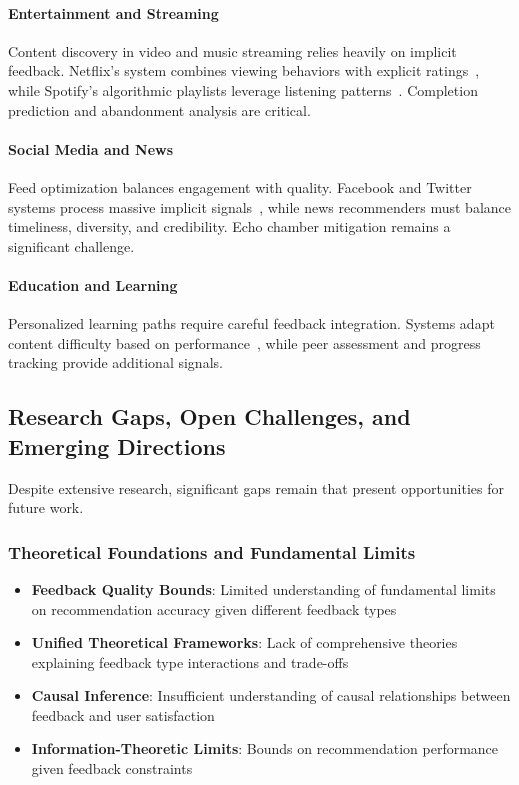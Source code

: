 \paragraph{Entertainment and Streaming}
Content discovery in video and music streaming relies heavily on implicit feedback. Netflix's system combines viewing behaviors with explicit ratings~\cite{gomez2015netflix}, while Spotify's algorithmic playlists leverage listening patterns~\cite{van2013deep}. Completion prediction and abandonment analysis are critical.

\paragraph{Social Media and News}
Feed optimization balances engagement with quality. Facebook and Twitter systems process massive implicit signals~\cite{wu2020mind}, while news recommenders must balance timeliness, diversity, and credibility. Echo chamber mitigation remains a significant challenge.

\paragraph{Education and Learning}
Personalized learning paths require careful feedback integration. Systems adapt content difficulty based on performance~\cite{tang2019towards}, while peer assessment and progress tracking provide additional signals.

\subsection{Research Gaps, Open Challenges, and Emerging Directions}

Despite extensive research, significant gaps remain that present opportunities for future work.

\subsubsection{Theoretical Foundations and Fundamental Limits}

\begin{itemize}
    \item \textbf{Feedback Quality Bounds}: Limited understanding of fundamental limits on recommendation accuracy given different feedback types
    \item \textbf{Unified Theoretical Frameworks}: Lack of comprehensive theories explaining feedback type interactions and trade-offs
    \item \textbf{Causal Inference}: Insufficient understanding of causal relationships between feedback and user satisfaction
    \item \textbf{Information-Theoretic Limits}: Bounds on recommendation performance given feedback constraints
\end{itemize}

